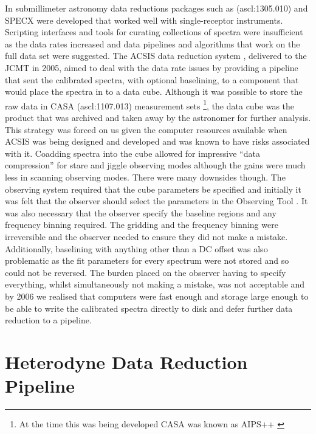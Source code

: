 \documentclass[final,authoryear,5p,times,twocolumn]{elsarticle}
\begin{document}
In submillimeter astronomy data reductions packages such as
(ascl:1305.010) and
SPECX \citep{SPECX} were developed that worked well with
single-receptor instruments. Scripting interfaces and tools for
curating collections of spectra were insufficient as the data rates
increased and data pipelines \citep[e.g.,][]{1995ASPC...75..117W} and
algorithms that work on the full data set
\citep[e.g.,][]{2002ASPC..278..329M} were suggested. The ACSIS data
reduction system \citep{2000ASPC..216..502L,2000SPIE.4015..114H},
delivered to the JCMT in 2005, aimed to deal with the data rate issues
by providing a pipeline that sent the calibrated spectra, with
optional baselining, to a component that would place the spectra in to
a data cube. Although it was possible to store the raw data in CASA
(ascl:1107.013) measurement sets \citep{2012ASPC..461..849P}\footnote{At the time this
  was being developed CASA was known as AIPS++
  \citep{2004ASPC..314..468M}}, the data cube was the product that was
archived and taken away by the astronomer for further analysis. This
strategy was forced on us given the computer resources available when
ACSIS was being designed and developed and was known to have risks
associated with it. Coadding spectra into the cube allowed for
impressive ``data compression'' for stare and jiggle observing modes
although the gains were much less in scanning observing modes. There
were many downsides though. The observing system required that the
cube parameters be specified and initially it was felt that the
observer should select the parameters in the Observing Tool
\citep{2002ASPC..281..453F}. It was also necessary that the observer
specify the baseline regions and any frequency binning required. The
gridding and the frequency binning were irreversible and the observer
needed to ensure they did not make a mistake. Additionally, baselining
with anything other than a DC offset was also problematic as the fit
parameters for every spectrum were not stored and so could not be
reversed. The burden placed on the observer having to specify
everything, whilst simultaneously not making a mistake, was not
acceptable and by 2006 we realised that computers were fast enough and
storage large enough to be able to write the calibrated spectra
directly to disk and defer further data reduction to a pipeline.

\section{Heterodyne Data Reduction Pipeline}
\end{document}
